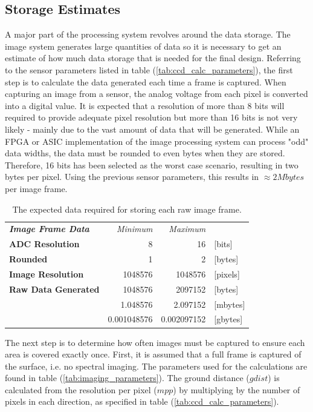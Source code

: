 \subsection{Storage Estimates}
A major part of the processing system revolves around the data storage. The image system generates large quantities of data so it is necessary to get an estimate of how much data storage that is needed for the final design. Referring to the sensor parameters listed in table (\ref{tab:ccd_calc_parameters}), the first step is to calculate the data generated each time a frame is captured. When capturing an image from a sensor, the analog voltage from each pixel is converted into a digital value. It is expected that a resolution of more than 8 bits will required to provide adequate pixel resolution but more than 16 bits is not very likely - mainly due to the vast amount of data that will be generated. While an FPGA or ASIC implementation of the image processing system can process "odd" data widths, the data must be rounded to even bytes when they are stored. Therefore, 16 bits has been selected as the worst case scenario, resulting in two bytes per pixel. Using the previous sensor parameters, this results in $\approx 2 Mbytes$ per image frame.
\begin{table}[h!]
  \centering
\begin{tabular}{l|r|r|l}
\textit{\textbf{Image Frame Data}} & \textit{Minimum} & \multicolumn{1}{r}{\textit{Maximum}} &  \bigstrut[b]\\
\cline{1-3}\textbf{ADC Resolution} & 8     & 16    & [bits] \bigstrut[t]\\
\textbf{Rounded} & 1     & 2     & [bytes] \bigstrut[b]\\
\cline{1-3}\textbf{Image Resolution} & 1048576 & 1048576 & [pixels] \bigstrut\\
\cline{1-3}\textbf{Raw Data Generated} & 1048576 & 2097152 & [bytes] \bigstrut[t]\\
      & 1.048576 & 2.097152 & [mbytes] \\
      & 0.001048576 & 0.002097152 & [gbytes] \\
\end{tabular}%
    \caption{The expected data required for storing each raw image frame.}
  \label{tab:img_frame_data}%
\end{table}%
The next step is to determine how often images must be captured to ensure each area is covered exactly once. First, it is assumed that a full frame is captured of the surface, i.e. no spectral imaging. The parameters used for the calculations are found in table (\ref{tab:imaging_parameters}). The ground distance ($gdist$) is calculated from the resolution per pixel ($mpp$) by multiplying by the number of pixels in each direction, as specified in table (\ref{tab:ccd_calc_parameters}).
